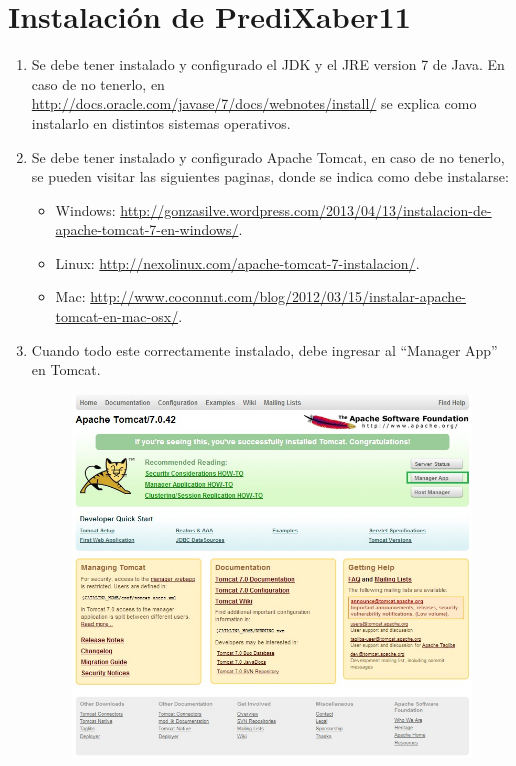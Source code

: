 \documentclass{article}
\begin{document}
\sloppy
\section*{Instalación de PrediXaber11}
\begin{enumerate}
\item Se debe tener instalado y configurado el JDK y el JRE version 7 de Java. En caso de no tenerlo, en \url{http://docs.oracle.com/javase/7/docs/webnotes/install/} se explica como instalarlo en distintos sistemas operativos.
\item Se debe tener instalado y configurado Apache Tomcat, en caso de no tenerlo, se pueden visitar las siguientes paginas, donde se indica como debe instalarse:
\begin{itemize}
\item Windows: \url{http://gonzasilve.wordpress.com/2013/04/13/instalacion-de-apache-tomcat-7-en-windows/}.
\item Linux: \url{http://nexolinux.com/apache-tomcat-7-instalacion/}.
\item Mac: \url{http://www.coconnut.com/blog/2012/03/15/instalar-apache-tomcat-en-mac-osx/}.
\end{itemize}
\item Cuando todo este correctamente instalado, debe ingresar al ``Manager App'' en Tomcat.
\begin{figure}[H]
\begin{centering}
\includegraphics[scale=0.5]{tomcat6}

\end{centering}
\end{figure}
\end{enumerate}
\end{document}
